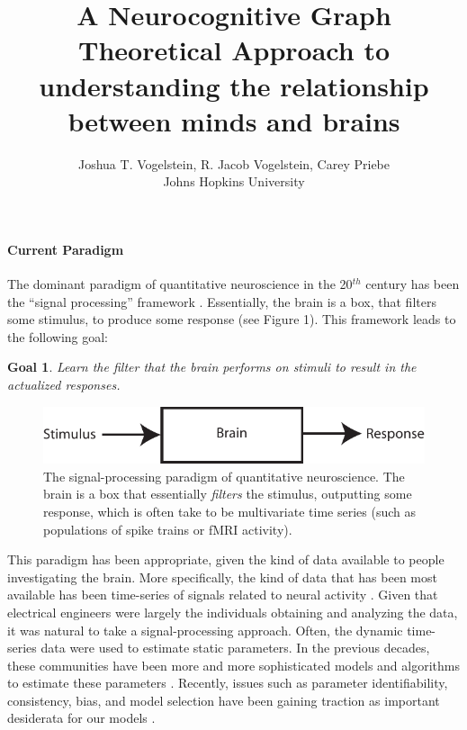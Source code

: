 

\newtheorem{goal}{Goal}
\newtheorem{desid}{Desiderata}
\newcommand{\zov}{\mathbb{Z}_1^V}
\newcommand{\zz}{\mathbb{Z}}
\newcommand{\nec}{NeCoG}


\title{A Neurocognitive Graph Theoretical Approach to understanding the relationship between minds and brains}

\author{Joshua T. Vogelstein, R. Jacob Vogelstein, Carey Priebe\\{Johns Hopkins University}}



\maketitle

\paragraph{Current Paradigm}

The dominant paradigm of quantitative neuroscience in the 20$^{th}$ century has been the ``signal processing'' framework \cite{}.  Essentially, the brain is a box, that filters some stimulus, to produce some response (see Figure 1). This framework leads to the following goal:

\begin{goal}
	Learn the filter that the brain performs on stimuli to result in the actualized responses.
\end{goal}

\begin{figure}[h!]
\centering \includegraphics{stim_brain_resp}
\caption{The signal-processing paradigm of quantitative neuroscience.  The brain is a box that essentially \emph{filters} the stimulus, outputting some response, which is often take to be multivariate time series (such as populations of spike trains or fMRI activity).} \label{fig:SBR}
\end{figure}


This paradigm has been appropriate, given the kind of data available to people investigating the brain.  More specifically, the kind of data that has been most available has been time-series of signals related to neural activity \cite{}.  Given that electrical engineers were largely the individuals obtaining and analyzing the data, it was natural to take a signal-processing approach.  Often, the dynamic time-series data were used to estimate static parameters.  In the previous decades, these communities have been more and more sophisticated models and algorithms to estimate these parameters \cite{}.  Recently, issues such as parameter identifiability, consistency, bias, and model selection have been gaining traction as important desiderata for our models \cite{}.  

